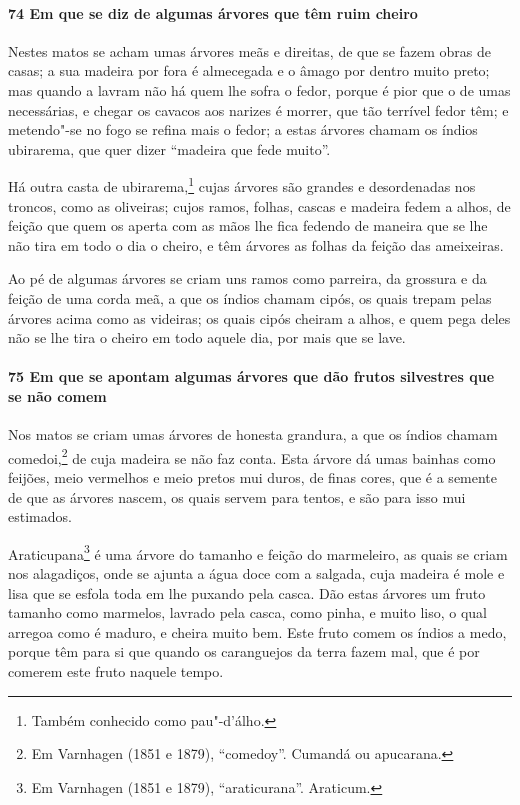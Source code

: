 \paragraph{74 Em que se diz de algumas árvores que têm ruim cheiro}

Nestes matos se acham umas árvores meãs e direitas, de que se fazem obras de casas; a sua
madeira por fora é almecegada e o âmago por dentro muito preto; mas quando a lavram não há
quem lhe sofra o fedor, porque é pior que o de umas necessárias, e chegar os cavacos aos
narizes é morrer, que tão terrível fedor têm; e metendo"-se no fogo se refina mais o fedor;
a estas árvores chamam os índios ubirarema, que quer dizer ``madeira que fede muito''.

Há outra casta de ubirarema,\footnote{ Também conhecido como pau"-d'álho.} cujas árvores
são grandes e desordenadas nos troncos, como as oliveiras; cujos ramos, folhas, cascas e
madeira fedem a alhos, de feição que quem os aperta com as mãos lhe fica fedendo de
maneira que se lhe não tira em todo o dia o cheiro, e têm árvores as folhas da feição das
ameixeiras.

Ao pé de algumas árvores se criam uns ramos como parreira, da grossura e da feição de uma
corda meã, a que os índios chamam cipós, os quais trepam pelas árvores acima como as
videiras; os quais cipós cheiram a alhos, e quem pega deles não se lhe tira o cheiro em
todo aquele dia, por mais que se lave.

\paragraph{75 Em que se apontam algumas árvores que dão frutos silvestres que se não
comem}

Nos matos se criam umas árvores de honesta grandura, a que os índios chamam
comedoi,\footnote{ Em Varnhagen (1851 e 1879), ``comedoy''. Cumandá ou apucarana.} de cuja
madeira se não faz conta. Esta árvore dá umas bainhas como feijões, meio vermelhos e meio
pretos mui duros, de finas cores, que é a semente de que as árvores nascem, os quais
servem para tentos, e são para isso mui estimados.


Araticupana\footnote{ Em Varnhagen (1851 e 1879), ``araticurana''. Araticum.} é uma árvore
do tamanho e feição do marmeleiro, as quais se criam nos alagadiços, onde se ajunta a água
doce com a salgada, cuja madeira é mole e lisa que se esfola toda em lhe puxando pela
casca. Dão estas árvores um fruto tamanho como marmelos, lavrado pela casca, como pinha, e
muito liso, o qual arregoa como é maduro, e cheira muito bem. Este fruto comem os índios a
medo, porque têm para si que quando os caranguejos da terra fazem mal, que é por comerem
este fruto naquele tempo.

